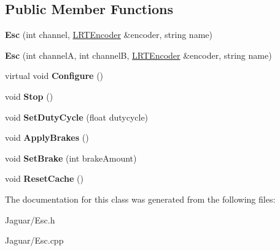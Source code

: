 \subsection*{\-Public \-Member \-Functions}
\begin{DoxyCompactItemize}
\item 
\hypertarget{class_esc_aa7c2ba2ac4f2d85a8208a1a5233fb4c9}{
{\bfseries \-Esc} (int channel, \hyperlink{class_l_r_t_encoder}{\-L\-R\-T\-Encoder} \&encoder, string name)}
\label{class_esc_aa7c2ba2ac4f2d85a8208a1a5233fb4c9}

\item 
\hypertarget{class_esc_ac12ce7d2797435669faa0385d926da03}{
{\bfseries \-Esc} (int channel\-A, int channel\-B, \hyperlink{class_l_r_t_encoder}{\-L\-R\-T\-Encoder} \&encoder, string name)}
\label{class_esc_ac12ce7d2797435669faa0385d926da03}

\item 
\hypertarget{class_esc_a68d0f30772baf6f0b20edd35143c641c}{
virtual void {\bfseries \-Configure} ()}
\label{class_esc_a68d0f30772baf6f0b20edd35143c641c}

\item 
\hypertarget{class_esc_a9fa344ee3919d8ef648afde0a5293e41}{
void {\bfseries \-Stop} ()}
\label{class_esc_a9fa344ee3919d8ef648afde0a5293e41}

\item 
\hypertarget{class_esc_a8d25275eb5049a2c07adaef48c8289c0}{
void {\bfseries \-Set\-Duty\-Cycle} (float dutycycle)}
\label{class_esc_a8d25275eb5049a2c07adaef48c8289c0}

\item 
\hypertarget{class_esc_a0f9303e993158962cf8dc3c7984be592}{
void {\bfseries \-Apply\-Brakes} ()}
\label{class_esc_a0f9303e993158962cf8dc3c7984be592}

\item 
\hypertarget{class_esc_a17ad62ceb63d917b00bc3ef4e50e3b61}{
void {\bfseries \-Set\-Brake} (int brake\-Amount)}
\label{class_esc_a17ad62ceb63d917b00bc3ef4e50e3b61}

\item 
\hypertarget{class_esc_a83732560f58e3515a7f81387312ad932}{
void {\bfseries \-Reset\-Cache} ()}
\label{class_esc_a83732560f58e3515a7f81387312ad932}

\end{DoxyCompactItemize}


\-The documentation for this class was generated from the following files\-:\begin{DoxyCompactItemize}
\item 
\-Jaguar/\-Esc.\-h\item 
\-Jaguar/\-Esc.\-cpp\end{DoxyCompactItemize}
